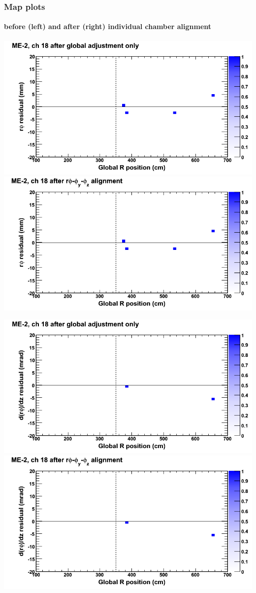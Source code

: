 \documentclass[compress]{beamer}
\begin{document}
\begin{frame}
\frametitle{Map plots}
\framesubtitle{before (left) and after (right) individual chamber alignment}
\includegraphics[width=0.5\linewidth]{ringmapplots_3dof/before_CSCvsr_mem2ch18_x.png} \includegraphics[width=0.5\linewidth]{ringmapplots_3dof/after_CSCvsr_mem2ch18_x.png}

\includegraphics[width=0.5\linewidth]{ringmapplots_3dof/before_CSCvsr_mem2ch18_dxdz.png} \includegraphics[width=0.5\linewidth]{ringmapplots_3dof/after_CSCvsr_mem2ch18_dxdz.png}
\end{frame}
\end{document}
